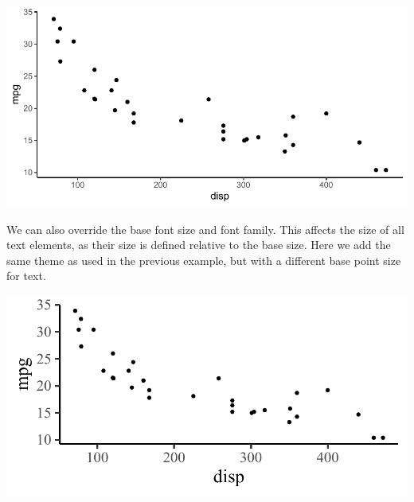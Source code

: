 \documentclass[krantz2]{krantz}\usepackage{knitr}
\begin{document}
\begin{knitrout}\footnotesize
{}\color{fgcolor}\begin{kframe}
\begin{alltt}
\hlstd{(} 
       \hlstd{(}    \hlopt{+}
  \hlstd{()} \hlopt{+}
  \hlstd{()}
\end{alltt}
\end{kframe}

{\centering \includegraphics[width=.7\textwidth]{figure/pos-ggplot-basics-09-1}

}



\end{knitrout}

We can also override the base font size and font family. This affects the size of all text elements, as their size is defined relative to the base size. Here we add the same theme as used in the previous example, but with a different base point size for text.

\begin{knitrout}\footnotesize
{}\color{fgcolor}\begin{kframe}
\begin{alltt}
\hlstd{(} 
       \hlstd{(}    \hlopt{+}
  \hlstd{()} \hlopt{+}
  \hlstd{(} \hlstd{=} \hlstd{,}  \hlstd{=} \hlstd{)}
\end{alltt}
\end{kframe}

{\centering \includegraphics[width=.7\textwidth]{figure/pos-ggplot-basics-10-1}

}



\end{knitrout}
\end{document}

